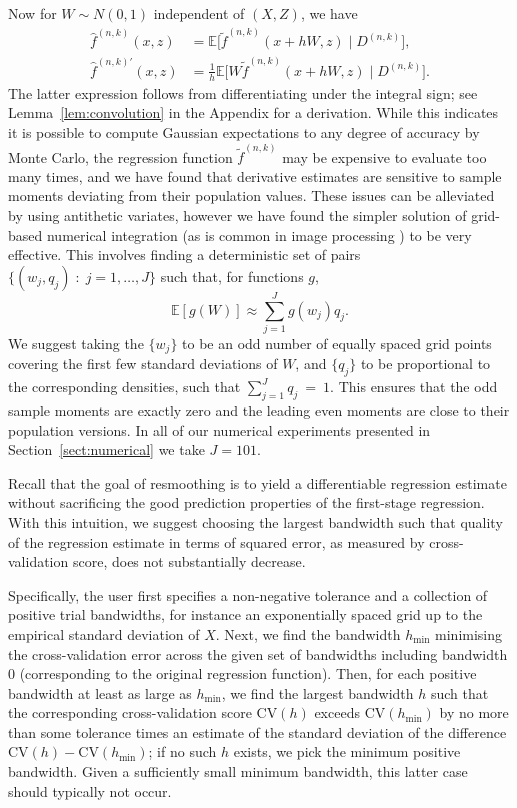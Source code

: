 \documentclass[aos]{imsart}
\newcommand{\E}{\mathbb{E}}
\begin{document}
	Now for $W\sim N(0,1)$ independent of $(X,Z)$, we have
	\begin{align*}
		\hat f^{(n,k)}(x,z) &=  \E\big[\tilde f^{(n,k)}(x+hW,z) \; \big| \; D^{(n,k)}\big],\\
		\hat f^{(n,k)\prime}(x,z) &=  \frac1h \E\big[W\tilde f^{(n,k)}(x+hW,z)\; \big|\; D^{(n,k)}\big].
	\end{align*}
	The latter expression follows from differentiating under the integral sign; see Lemma~\ref{lem:convolution} in the Appendix for a derivation.
	While this indicates it is possible to compute Gaussian expectations to any degree of accuracy by Monte Carlo, the regression function $\tilde f^{(n,k)}$ may be expensive to evaluate too many times, and we have found that derivative estimates are sensitive to sample moments deviating from their population values. These issues can be alleviated by using antithetic variates, however we have found the simpler solution of grid-based numerical integration (as is common in image processing \citep{CannyEdge}) to be very effective. This involves finding a deterministic set of pairs $\{(w_j, q_j)\;:\;j=1,\ldots,J\}$ such that, for functions $g$, \begin{equation*}
		\E [g(W)] \approx \sum_{j=1}^J g(w_j)q_j.
	\end{equation*} We suggest taking the $\{w_j\}$ to be an odd number of equally spaced grid points covering the first few standard deviations of $W$, and $\{q_j\}$ to be proportional to the corresponding densities, such that $\sum_{j=1}^J q_j~=~1$. This ensures that the odd sample moments are exactly zero and the leading even moments are close to their population versions. In all of our numerical experiments presented in Section~\ref{sect:numerical} we take $J=101$.
	
	Recall that the goal of resmoothing is to yield a differentiable regression estimate without sacrificing the good prediction properties of the first-stage regression. With this intuition, we suggest choosing the largest bandwidth such that quality of the regression estimate in terms of squared error, as measured by cross-validation score, does not substantially decrease.
	
Specifically, the user first specifies a non-negative tolerance and a collection of positive trial bandwidths, for instance an exponentially spaced grid up to the empirical standard deviation of $X$. Next, we find the bandwidth $h_{\min}$ minimising the cross-validation error across the given set of bandwidths including bandwidth $0$ (corresponding to the original regression function). Then, for each positive bandwidth at least as large as $h_{\min}$, we find the largest bandwidth $h$ such that the corresponding cross-validation score $\text{CV}(h)$ exceeds $\text{CV}(h_{\min})$ by no more than some tolerance times an estimate of the standard deviation of the difference $\text{CV}(h)-\text{CV}(h_{\min})$; if no such $h$ exists, we pick the minimum positive bandwidth. Given a sufficiently small minimum bandwidth, this latter case should typically not occur.
	
\end{document}
